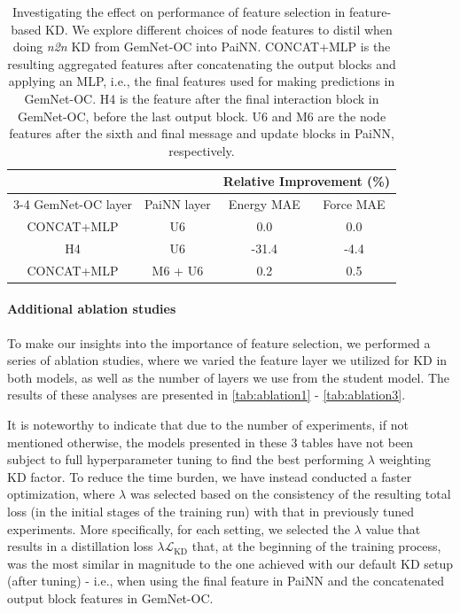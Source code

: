 \documentclass{article}
\newcommand{\loss}{\mathcal{L}}
\begin{document}
\begin{table}[h]
\centering
\caption{\label{tab:features} Investigating the effect on performance of feature selection in feature-based KD. We explore different choices of node features to distil when doing \emph{n2n} KD from GemNet-OC into PaiNN. CONCAT+MLP is the resulting aggregated features after concatenating the output blocks and applying an MLP, i.e., the final features used for making predictions in GemNet-OC. H4 is the feature after the final interaction block in GemNet-OC, before the last output block. U6 and M6 are the node features after the sixth and final message and update blocks in PaiNN, respectively.}
\begin{tabular}{cccc}
                &                              & \multicolumn{2}{c}{Relative Improvement (\%)} \\ \cline{3-4} 
GemNet-OC layer & PaiNN layer                  & Energy MAE             & Force MAE            \\ \hline
CONCAT+MLP      & \multicolumn{1}{c|}{U6}      & 0.0                    & 0.0                  \\
H4              & \multicolumn{1}{c|}{U6}      & -31.4                  & -4.4                 \\
CONCAT+MLP      & \multicolumn{1}{c|}{M6 + U6} & 0.2                    & 0.5                    
\end{tabular}
\end{table}

\paragraph{Additional ablation studies} 
To make our insights into the importance of feature selection, we performed a series of ablation studies, where we varied the feature layer we utilized for KD in both models, as well as the number of layers we use from the student model. The results of these analyses are presented in
\cref{tab:ablation1} - \cref{tab:ablation3}.

It is noteworthy to indicate that due to the number of experiments, if not mentioned otherwise, the models presented in these 3 tables have not been subject to full hyperparameter tuning to find the best performing $\lambda$ weighting KD factor. To reduce the time burden, we have instead conducted a faster optimization, where $\lambda$ was selected based on the consistency of the resulting total loss (in the initial stages of the training run) with that in previously tuned experiments. More specifically, for each setting, we selected the $\lambda$ value that results in a distillation loss $\lambda \loss_{\text{KD}}$ that, at the beginning of the training process, was the most similar in magnitude to the one achieved with our default KD setup (after tuning) - i.e., when using the final feature in PaiNN and the concatenated output block features in GemNet-OC.
 
\end{document}
